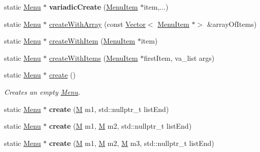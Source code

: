 \begin{DoxyCompactItemize}
\mbox{\label{classMenu_a84e392cbe044ff74f9d7c05f5757235f}} 
static \hyperlink{classMenu}{Menu} $\ast$ {\bfseries variadic\+Create} (\hyperlink{classMenuItem}{Menu\+Item} $\ast$item,...)
\item 
static \hyperlink{classMenu}{Menu} $\ast$ \hyperlink{classMenu_a31a4c48de52e869c966c66520e66bd55}{create\+With\+Array} (const \hyperlink{classVector}{Vector}$<$ \hyperlink{classMenuItem}{Menu\+Item} $\ast$$>$ \&array\+Of\+Items)
\item 
static \hyperlink{classMenu}{Menu} $\ast$ \hyperlink{classMenu_ac0ed48fb583a961b23f517ae87226c6e}{create\+With\+Item} (\hyperlink{classMenuItem}{Menu\+Item} $\ast$item)
\item 
static \hyperlink{classMenu}{Menu} $\ast$ \hyperlink{classMenu_adbd50ef904f6614d63b6ef6319af14d0}{create\+With\+Items} (\hyperlink{classMenuItem}{Menu\+Item} $\ast$first\+Item, va\+\_\+list args)
\item 
\mbox{\label{classMenu_ac42152113cd64239dc16d3e7c1f3baab}} 
static \hyperlink{classMenu}{Menu} $\ast$ \hyperlink{classMenu_ac42152113cd64239dc16d3e7c1f3baab}{create} ()
\begin{DoxyCompactList}\small\item\em Creates an empty \hyperlink{classMenu}{Menu}. \end{DoxyCompactList}\item 
\mbox{\label{classMenu_a97edcb72ebe24315e0b465279c0f6ee5}} 
static \hyperlink{classMenu}{Menu} $\ast$ {\bfseries create} (\hyperlink{classMenuItem}{M} m1, std\+::nullptr\+\_\+t list\+End)
\item 
\mbox{\label{classMenu_a421c34c2d1622966557947cc37e11e75}} 
static \hyperlink{classMenu}{Menu} $\ast$ {\bfseries create} (\hyperlink{classMenuItem}{M} m1, \hyperlink{classMenuItem}{M} m2, std\+::nullptr\+\_\+t list\+End)
\item 
\mbox{\label{classMenu_adb6a256ccb1d925bc520bb9f8896d048}} 
static \hyperlink{classMenu}{Menu} $\ast$ {\bfseries create} (\hyperlink{classMenuItem}{M} m1, \hyperlink{classMenuItem}{M} m2, \hyperlink{classMenuItem}{M} m3, std\+::nullptr\+\_\+t list\+End)
\item 
\mbox{\label{classMenu_a3cf059365eccbd9ef7f45b6b650da0c9}} 
$$
\end{DoxyCompactItemize}
